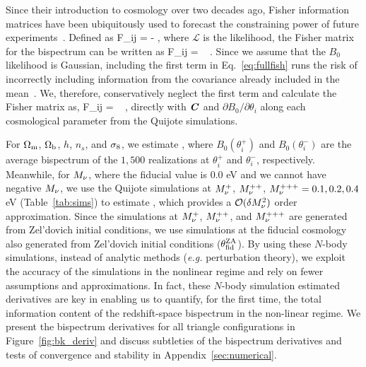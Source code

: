 Since their introduction to cosmology over two decades ago, Fisher information 
matrices have been ubiquitously used to forecast the constraining power of future 
experiments~\citep[\emph{e.g.}][]{jungman1996,tegmark1997,dodelson2003,heavens2009,verde2010}. 
Defined as 
\beq 
F_{ij} = - \bigg \langle {} \bigg \rangle,
\eeq
where $\mathcal{L}$ is the likelihood, the Fisher matrix for the bispectrum can 
be written as 
\beq \label{eq:fullfish} 
F_{ij} = ~ .
\eeq
Since we assume that the $B_0$ likelihood is Gaussian, including the first 
term in Eq.~\ref{eq:fullfish} runs the risk of incorrectly including information 
from the covariance already included in the mean~\citep{carron2013}. We, therefore,
conservatively neglect the first term and calculate the Fisher matrix as, 
\beq \label{eq:fisher}
F_{ij} = ~ ,
\eeq
directly with $\textbf{\textit{C}}$ and $\partial B_0/\partial \theta_i$ along each cosmological 
parameter from the Quijote simulations. 

For $\Omega_{\rm m}$, $\Omega_{\rm b}$, $h$, $n_s$, and $\sigma_8$, we estimate 
\beq \label{eq:dbkdt} 
 \approx {}, 
\eeq
where $B_0(\theta_i^{+})$ and $B_0(\theta_i^{-})$ are the average bispectrum of the 
$1,500$ realizations at $\theta_i^{+}$ and $\theta_i^{-}$, 
respectively. Meanwhile, for $M_\nu$, where the fiducial value is 0.0 eV and we 
cannot have negative $M_\nu$, we use the Quijote simulations at $M_\nu^+$, 
$M_\nu^{++}$, 
$M_\nu^{+++}=0.1, 0.2, 0.4$ eV (Table~\ref{tab:sims}) to estimate 
\beq \label{eq:dbkdmnu} 
 \approx {}, 
\eeq
which provides a $\mathcal{O}(\delta M_\nu^2)$ order approximation. 
Since the simulations at $M_\nu^+$, $M_\nu^{++}$, and $M_\nu^{+++}$ are generated 
from Zel'dovich initial conditions, we use simulations at the fiducial cosmology 
also generated from Zel'dovich initial conditions ($\theta_{\rm fid}^{\rm ZA}$). 
By using these $N$-body simulations, instead of analytic methods (\emph{e.g.} perturbation theory), 
we exploit the accuracy of the simulations in the nonlinear regime and rely on fewer 
assumptions and approximations. In fact, these $N$-body simulation estimated 
derivatives are key in enabling us to quantify, for the first time, the total information 
content of the redshift-space bispectrum in the non-linear regime. We present the 
bispectrum derivatives for all triangle configurations in Figure~\ref{fig:bk_deriv} and  
discuss subtleties of the bispectrum derivatives and tests of convergence and stability 
in Appendix~\ref{sec:numerical}. 

